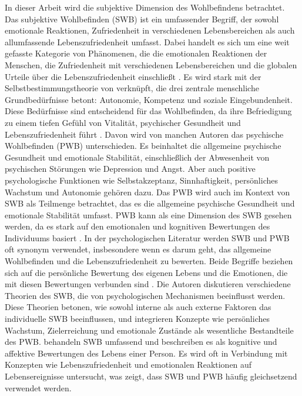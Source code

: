 In dieser Arbeit wird die subjektive Dimension des Wohlbefindens betrachtet. Das subjektive Wohlbefinden (SWB) ist ein umfassender Begriff, der sowohl emotionale Reaktionen, Zufriedenheit in verschiedenen Lebensbereichen als auch allumfassende Lebenszufriedenheit umfasst. Dabei handelt es sich um eine weit gefasste Kategorie von Phänomenen, die die emotionalen Reaktionen der Menschen, die Zufriedenheit mit verschiedenen Lebensbereichen und die globalen Urteile über die Lebenszufriedenheit einschließt \parencite{DienerEtAl1999}. Es wird stark mit der Selbstbestimmungstheorie von \textcite{DeciRyan2000} verknüpft, die drei zentrale menschliche Grundbedürfnisse betont: Autonomie, Kompetenz und soziale Eingebundenheit. Diese Bedürfnisse sind entscheidend für das Wohlbefinden, da ihre Befriedigung zu einem tiefen Gefühl von Vitalität, psychischer Gesundheit und Lebenszufriedenheit führt \parencite{DeciRyan2000, NgEtAl2012}. Davon wird von manchen Autoren das psychische Wohlbefinden (PWB) unterschieden. Es beinhaltet die allgemeine psychische Gesundheit und emotionale Stabilität, einschließlich der Abwesenheit von psychischen Störungen wie Depression und Angst. Aber auch positive psychologische Funktionen wie Selbstakzeptanz, Sinnhaftigkeit, persönliches Wachstum und Autonomie gehören dazu. Das PWB wird auch im Kontext von SWB als Teilmenge betrachtet, das es die allgemeine psychische Gesundheit und emotionale Stabilität umfasst. PWB kann als eine Dimension des SWB gesehen werden, da es stark auf den emotionalen und kognitiven Bewertungen des Individuums basiert \parencite{MalyMotta2023}. In der psychologischen Literatur werden SWB und PWB oft synonym verwendet, insbesondere wenn es darum geht, das allgemeine Wohlbefinden und die Lebenszufriedenheit zu bewerten. Beide Begriffe beziehen sich auf die persönliche Bewertung des eigenen Lebens und die Emotionen, die mit diesen Bewertungen verbunden sind \parencite{DienerEtAl1999}. Die Autoren \textcite{DasEtAl2020} diskutieren verschiedene Theorien des SWB, die von psychologischen Mechanismen beeinflusst werden. Diese Theorien betonen, wie sowohl interne als auch externe Faktoren das individuelle SWB beeinflussen, und integrieren Konzepte wie persönliches Wachstum, Zielerreichung und emotionale Zustände als wesentliche Bestandteile des PWB. \textcite{DienerEtAl2009} behandeln SWB umfassend und beschreiben es als kognitive und affektive Bewertungen des Lebens einer Person. Es wird oft in Verbindung mit Konzepten wie Lebenszufriedenheit und emotionalen Reaktionen auf Lebensereignisse untersucht, was zeigt, dass SWB und PWB häufig gleichsetzend verwendet werden. 

